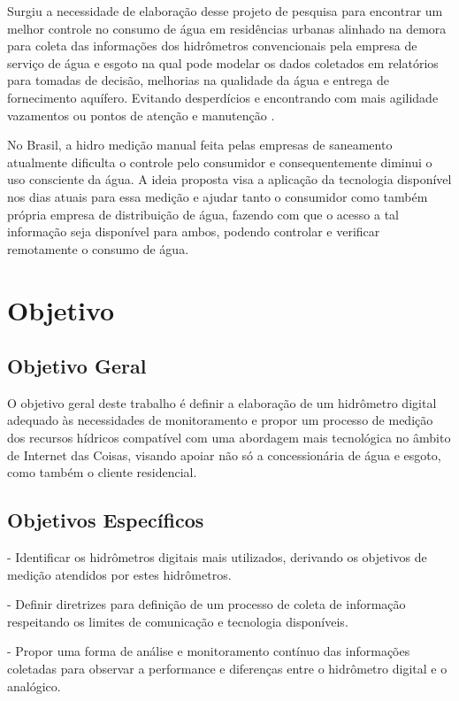 \documentclass[
	article,			%
	11pt,				%
	oneside,			%
	a4paper,			%
	english,			%
	brazil,				%
	sumario=tradicional,
	doublespacing
	]{abntex2}
\begin{document}
\begin{DoubleSpace}
    Surgiu a necessidade de elaboração desse projeto de pesquisa para encontrar um melhor controle no consumo de água em residências urbanas alinhado na demora para coleta das informações dos hidrômetros convencionais pela empresa de serviço de água e esgoto na qual pode modelar os dados coletados em relatórios para tomadas de decisão, melhorias na qualidade da água e entrega
    de fornecimento aquífero. Evitando desperdícios e encontrando com mais agilidade vazamentos ou pontos de atenção e manutenção  \cite{grosskopf2017controlando}.
    
    No Brasil, a hidro medição manual feita pelas empresas de saneamento atualmente dificulta o controle 
    pelo consumidor e consequentemente diminui o uso consciente da água.
    A ideia proposta visa a aplicação da tecnologia disponível nos dias atuais para essa medição
    e ajudar tanto o consumidor como também própria empresa de distribuição de água, fazendo com que o
    acesso a tal informação seja disponível para ambos, podendo controlar e verificar remotamente o consumo
    de água. 

\section{Objetivo}
\subsection{Objetivo Geral}
O objetivo geral deste trabalho é definir a elaboração de um hidrômetro digital adequado às necessidades de monitoramento e propor um processo de medição dos recursos hídricos compatível com uma abordagem mais tecnológica no âmbito de Internet das Coisas, visando apoiar não só a concessionária de água e esgoto, como também o cliente residencial.

\subsection{Objetivos Específicos}
- Identificar os hidrômetros digitais mais utilizados, derivando os objetivos de medição atendidos por estes hidrômetros.

- Definir diretrizes para definição de um processo de coleta de informação respeitando os limites de comunicação e tecnologia disponíveis.

- Propor uma forma de análise e monitoramento contínuo das informações coletadas para observar a performance e diferenças entre o hidrômetro digital e o analógico.


\end{DoubleSpace}
\end{document}
